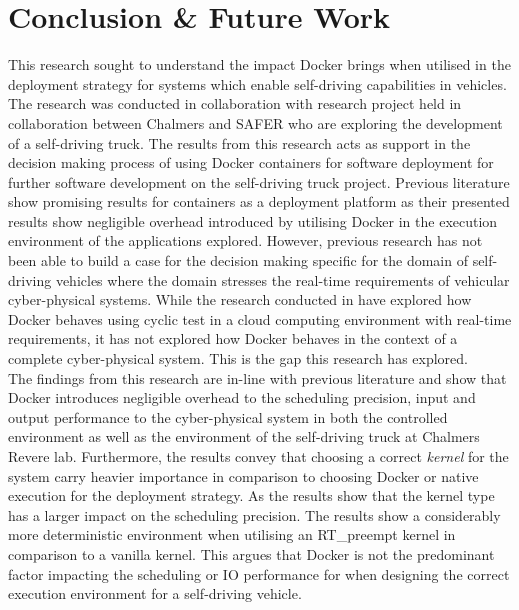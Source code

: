 \iffalse  \fi
\chapter{Conclusion \& Future Work} \label{section:conclusion}

This research sought to understand the impact Docker brings when utilised in the deployment strategy for systems which enable self-driving capabilities in vehicles. The research was conducted in collaboration with research project held in collaboration between Chalmers and SAFER who are exploring the development of a self-driving truck. The results from this research acts as support in the decision making process of using Docker containers for software deployment for further software development on the self-driving truck project. Previous literature \cite{p6,c2,p3,p4,p7,c1} show promising results for containers as a deployment platform as their presented results show negligible overhead introduced by utilising Docker in the execution environment of the applications explored. However, previous research has not been able to build a case for the decision making specific for the domain of self-driving vehicles where the domain stresses the real-time requirements of vehicular cyber-physical systems. While the research conducted in \cite{p1} have explored how Docker behaves using cyclic test in a cloud computing environment with real-time requirements, it has not explored how Docker behaves in the context of a complete cyber-physical system. This is the gap this research has explored.\\

The findings from this research are in-line with previous literature and show that Docker introduces negligible overhead to the scheduling precision, input and output performance to the cyber-physical system in both the controlled environment as well as the environment of the self-driving truck at Chalmers Revere lab. Furthermore, the results convey that choosing a correct \textit{kernel} for the system carry heavier importance in comparison to choosing Docker or native execution for the deployment strategy. As the results show that the kernel type has a larger impact on the scheduling precision. The results show a considerably more deterministic environment when utilising an RT\_preempt kernel in comparison to a vanilla kernel. This argues that Docker is not the predominant factor impacting the scheduling or IO performance for when designing the correct execution environment for a self-driving vehicle.\\

